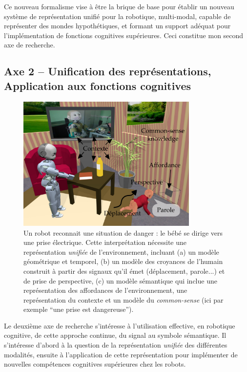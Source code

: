 \documentclass[a4paper]{article}
\begin{document}
Ce nouveau formalisme vise à être la brique de base pour établir un nouveau
système de représentation unifié pour la robotique, multi-modal, capable de
représenter des mondes hypothétiques, et formant un support adéquat pour l'implémentation
de fonctions cognitives supérieures. Ceci constitue mon second axe de recherche.

\subsection*{Axe 2 -- Unification des représentations, Application aux fonctions
cognitives}

\begin{figure}
    \centering
\includegraphics[width=0.8\textwidth]{figs/signaux}
\caption{\small Un robot reconnait une situation de danger : le bébé se dirige
    vers une prise électrique. Cette interprétation nécessite une représentation
    \emph{unifiée} de l'environnement, incluant (a) un modèle géométrique et
    temporel, (b) un modèle des croyances de l'humain construit à partir des
    signaux qu'il émet (déplacement, parole...) et de prise de perspective, (c)
    un modèle sémantique qui inclue une représentation des affordances de
    l'environnement, une représentation du contexte et un modèle du
    \emph{common-sense} (ici par exemple ``une prise est dangereuse'').}

\label{babyplug}
\end{figure}

Le deuxième axe de recherche s'intéresse à l'utilisation effective, en robotique
cognitive, de cette approche continue, du signal au symbole sémantique. Il
s'intéresse d'abord à la question de la représentation \emph{unifiée} des
différentes modalités, ensuite à l'application de cette représentation pour
implémenter de nouvelles compétences cognitives supérieures chez les robots.
\end{document}
